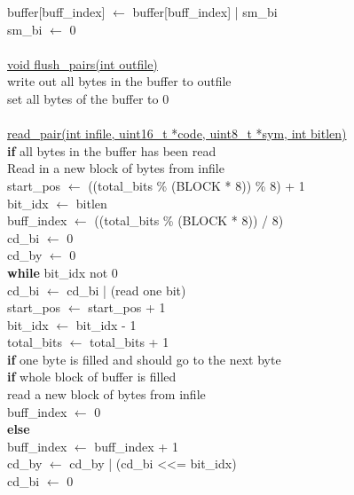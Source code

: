 \documentclass[12pt]{article}
\begin{document}
\indent \indent \indent \indent buffer[buff\_index] $\leftarrow$ buffer[buff\_index] | sm\_bi \\
\indent \indent \indent \indent sm\_bi $\leftarrow$ 0 \\
\\
\underline{void flush\_pairs(int outfile)} \\
\indent write out all bytes in the buffer to outfile \\
\indent set all bytes of the buffer to 0 \\
\\
\underline{read\_pair(int infile, uint16\_t *code, uint8\_t *sym, int bitlen)} \\
\indent \textbf{if} all bytes in the buffer has been read \\
\indent \indent Read in a new block of bytes from infile \\
\indent start\_pos $\leftarrow$ ((total\_bits \% (BLOCK * 8)) \% 8) + 1 \\
\indent bit\_idx $\leftarrow$ bitlen \\
\indent buff\_index $\leftarrow$ ((total\_bits \% (BLOCK * 8)) / 8) \\
\indent cd\_bi $\leftarrow$ 0 \\
\indent cd\_by $\leftarrow$ 0 \\
\indent \textbf{while} bit\_idx not 0 \\
\indent \indent cd\_bi $\leftarrow$ cd\_bi | (read one bit) \\
\indent \indent start\_pos $\leftarrow$ start\_pos + 1 \\
\indent \indent bit\_idx $\leftarrow$ bit\_idx - 1 \\
\indent \indent total\_bits $\leftarrow$ total\_bits + 1 \\
\indent \indent \textbf{if} one byte is filled and should go to the next byte \\
\indent \indent \indent \textbf{if} whole block of buffer is filled \\
\indent \indent \indent \indent read a new block of bytes from infile \\
\indent \indent \indent \indent buff\_index $\leftarrow$ 0 \\
\indent \indent \indent \textbf{else} \\
\indent \indent \indent \indent buff\_index $\leftarrow$ buff\_index + 1 \\
\indent \indent \indent cd\_by $\leftarrow$ cd\_by | (cd\_bi <<= bit\_idx) \\
\indent \indent \indent cd\_bi $\leftarrow$ 0 \\
\end{document}
